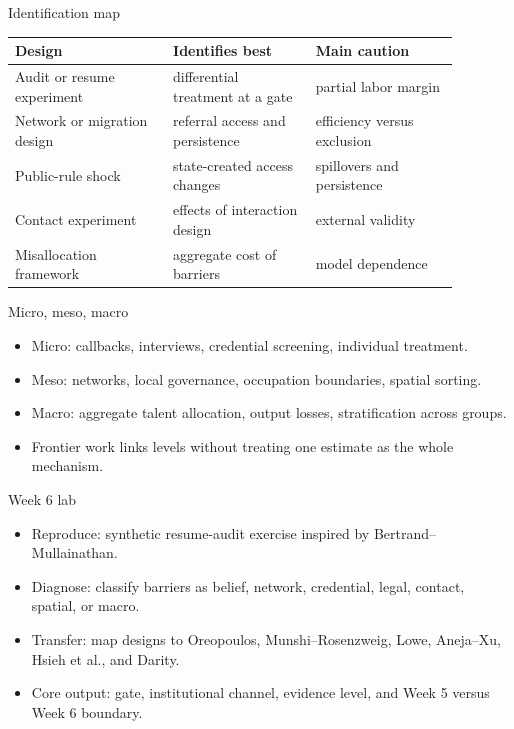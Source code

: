 \documentclass[aspectratio=169,11pt]{beamer}
\begin{document}
\begin{frame}{Identification map}
\small
\begin{tabular}{p{0.31\linewidth} p{0.29\linewidth} p{0.28\linewidth}}
\toprule
Design & Identifies best & Main caution \\
\midrule
Audit or resume experiment & differential treatment at a gate & partial labor margin \\
Network or migration design & referral access and persistence & efficiency versus exclusion \\
Public-rule shock & state-created access changes & spillovers and persistence \\
Contact experiment & effects of interaction design & external validity \\
Misallocation framework & aggregate cost of barriers & model dependence \\
\bottomrule
\end{tabular}
\end{frame}

\begin{frame}{Micro, meso, macro}
\begin{itemize}
    \item Micro: callbacks, interviews, credential screening, individual treatment.
    \item Meso: networks, local governance, occupation boundaries, spatial sorting.
    \item Macro: aggregate talent allocation, output losses, stratification across groups.
    \item Frontier work links levels without treating one estimate as the whole mechanism.
\end{itemize}
\end{frame}

\begin{frame}{Week 6 lab}
\begin{itemize}
    \item Reproduce: synthetic resume-audit exercise inspired by Bertrand--Mullainathan.
    \item Diagnose: classify barriers as belief, network, credential, legal, contact, spatial, or macro.
    \item Transfer: map designs to Oreopoulos, Munshi--Rosenzweig, Lowe, Aneja--Xu, Hsieh et al., and Darity.
    \item Core output: gate, institutional channel, evidence level, and Week 5 versus Week 6 boundary.
\end{itemize}
\end{frame}
\end{document}
